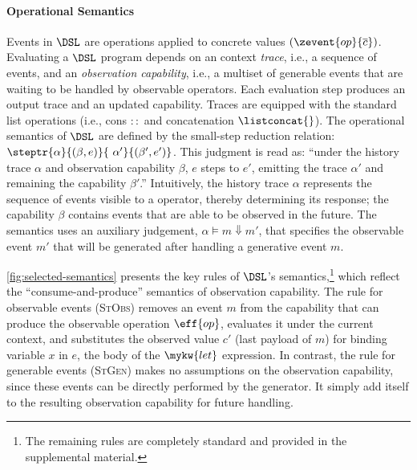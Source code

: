 \paragraph{Operational Semantics} Events in $\DSL$ are operations
applied to concrete values $(\zevent{op}{\overline{c}})$. Evaluating a
$\DSL$ program depends on an context \emph{trace}, i.e., a sequence of
events, and an \emph{observation capability}, i.e., a multiset of
generable events that are waiting to be handled by observable
operators. Each evaluation step produces an output trace and an
updated capability. Traces are equipped with the standard list
operations (i.e., cons ${::}$ and concatenation $\listconcat{}$).  The
operational semantics of $\DSL$ are defined by the small-step
reduction relation:
$\steptr{\alpha}{(\beta, e)}{~\alpha'}{(\beta', e')}$.  This judgment
is read as: ``under the history trace $\alpha$ and observation
capability $\beta$, $e$ steps to $e'$, emitting the trace $\alpha'$
and remaining the capability $\beta'$.'' Intuitively, the history
trace $\alpha$ represents the sequence of events visible to a
operator, thereby determining its response; the capability $\beta$
contains events that are able to be observed in the future. The
semantics uses an auxiliary judgement,
$\alpha \vDash m \Downarrow m'$, that specifies the observable event
$m'$ that will be generated after handling a generative event $m$.

\autoref{fig:selected-semantics} presents the key rules of $\DSL$'s
semantics,\footnote{The remaining rules are completely standard and
  provided in the supplemental material.} which reflect the
``consume-and-produce'' semantics of observation capability.  The rule
for observable events (\textsc{StObs}) removes an event $m$ from the
capability that can produce the observable operation $\eff{op}$,
evaluates it under the current context, and substitutes the observed
value $c'$ (last payload of $m$) for binding variable $x$ in $e$, the
body of the $\mykw{let}$ expression.  In contrast, the rule for
generable events (\textsc{StGen}) makes no assumptions on the
observation capability, since these events can be directly performed
by the generator. It simply add itself to the resulting observation
capability for future handling.

